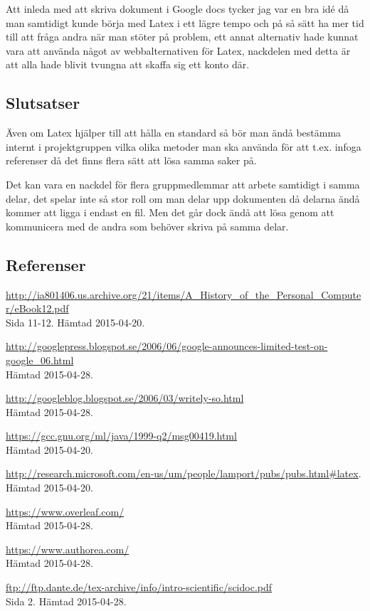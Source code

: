 Att inleda med att skriva dokument i Google docs tycker jag var en bra idé då man samtidigt kunde börja med Latex i ett lägre tempo och på så sätt ha mer tid till att fråga andra när man stöter på problem, ett annat alternativ hade kunnat vara att använda något av webbalternativen för Latex, nackdelen med detta är att alla hade blivit tvungna att skaffa sig ett konto där.

\subsection{Slutsatser}
Även om Latex hjälper till att hålla en standard så bör man ändå bestämma internt i projektgruppen vilka olika metoder man ska använda för att t.ex. infoga referenser då det finns flera sätt att lösa samma saker på.

Det kan vara en nackdel för flera gruppmedlemmar att arbete samtidigt i samma delar, det spelar inte så stor roll om man delar upp dokumenten då delarna ändå kommer att ligga i endast en fil. Men det går dock ändå att lösa genom att kommunicera med de andra som behöver skriva på samma delar.

\subsection{Referenser}
\vspace{-9mm}
\renewcommand{\refname}{}
\begin{thebibliography}{9}
\footnotesize
{}
\url{http://ia801406.us.archive.org/21/items/A_History_of_the_Personal_Computer/eBook12.pdf}\\
 Sida 11-12. Hämtad 2015-04-20.

\url{http://googlepress.blogspot.se/2006/06/google-announces-limited-test-on-google_06.html}\\
 Hämtad 2015-04-28.

\url{http://googleblog.blogspot.se/2006/03/writely-so.html}\\
 Hämtad 2015-04-28. 

\url{https://gcc.gnu.org/ml/java/1999-q2/msg00419.html}\\
 Hämtad 2015-04-20.

\url{http://research.microsoft.com/en-us/um/people/lamport/pubs/pubs.html#latex}.\\
 Hämtad 2015-04-20.
 
\url{https://www.overleaf.com/}\\
 Hämtad 2015-04-28.

\url{https://www.authorea.com/}\\
 Hämtad 2015-04-28.
 
\url{ftp://ftp.dante.de/tex-archive/info/intro-scientific/scidoc.pdf}\\
Sida 2. Hämtad 2015-04-28.

\end{thebibliography}

